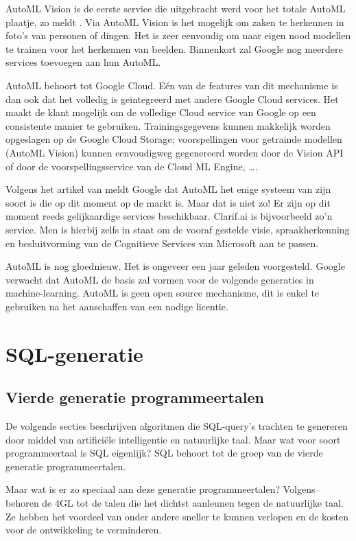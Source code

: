 AutoML Vision is de eerste service die uitgebracht werd voor het totale AutoML plaatje, zo meldt \textcite{automl}. Via AutoML Vision is het mogelijk om zaken te herkennen in foto’s van personen of dingen. Het is zeer eenvoudig om naar eigen nood modellen te trainen voor het herkennen van beelden. Binnenkort zal Google nog meerdere services toevoegen aan hun AutoML.

AutoML behoort tot Google Cloud. Eén van de features van dit mechanisme is dan ook dat het volledig is geïntegreerd met andere Google Cloud services. Het maakt de klant mogelijk om de volledige Cloud service van Google op een consistente manier te gebruiken. Trainingsgegevens kunnen makkelijk worden opgeslagen op de Google Cloud Storage; voorspellingen voor getrainde modellen (AutoML Vision) kunnen eenvoudigweg gegenereerd worden door de Vision API of door de voorspellingsservice van de Cloud ML Engine, \dots.

Volgens het artikel van \textcite{tc} meldt Google dat AutoML het enige systeem van zijn soort is die op dit moment op de markt is. Maar dat is niet zo! Er zijn op dit moment reeds gelijkaardige services beschikbaar. Clarif.ai is bijvoorbeeld zo’n service. Men is hierbij zelfs in staat om de vooraf gestelde visie, spraakherkenning en besluitvorming van de Cognitieve Services van Microsoft aan te passen.
 
AutoML is nog gloednieuw. Het is ongeveer een jaar geleden voorgesteld. Google verwacht dat AutoML de basis zal vormen voor de volgende generaties in machine-learning. AutoML is geen open source mechanisme, dit is enkel te gebruiken na het aanschaffen van een nodige licentie.

\section{SQL-generatie}

\subsection{Vierde generatie programmeertalen}

De volgende secties beschrijven algoritmen die SQL-query's trachten te genereren door middel van artificiële intelligentie en natuurlijke taal. Maar wat voor soort programmeertaal is SQL eigenlijk? SQL behoort tot de groep van de vierde generatie programmeertalen.

Maar wat is er zo speciaal aan deze generatie programmeertalen? Volgens \textcite{fourthgenpl} behoren de 4GL tot de talen die het dichtst aanleunen tegen de natuurlijke taal. Ze hebben het voordeel van onder andere sneller te kunnen verlopen en de kosten voor de ontwikkeling te verminderen.

